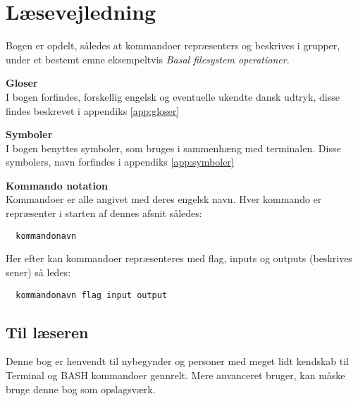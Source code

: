 \chapter*{Læsevejledning}
Bogen er opdelt, således at kommandoer repræsenters og beskrives
i grupper, under et bestemt emne eksempeltvis \emph{Basal filesystem operationer}. \par
\textbf{Gloser}\\
I bogen forfindes, forskellig engelsk og eventuelle ukendte dansk udtryk,
disse findes beskrevet i appendiks \ref{app:gloser} \par
\textbf{Symboler}\\
I bogen benyttes symboler, som bruges i sammenhæng med terminalen. Disse symbolers, navn forfindes i appendiks \ref{app:symboler}\par
\textbf{Kommando notation}\\
Kommandoer er alle angivet med deres engelsk navn. Hver kommando er
repræsenter i starten af dennes afsnit således:
\begin{lstlisting}
  kommandonavn
\end{lstlisting}
Her efter kan kommandoer repræsenteres med flag, inputs og outputs (beskrives sener) så ledes:
\begin{lstlisting}
  kommandonavn flag input output
\end{lstlisting}

\section*{Til læseren}
Denne bog er henvendt til nybegynder og personer med meget lidt kendskab til
Terminal og BASH kommandoer gennrelt. Mere anvanceret bruger, kan måske
bruge denne bog som opslagsværk.
